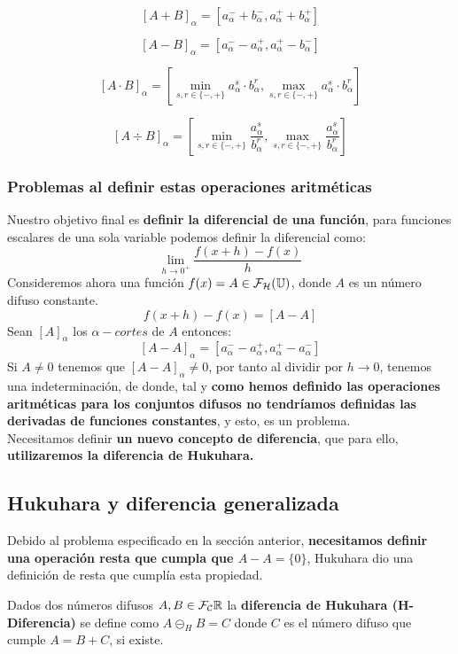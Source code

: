 $$
[A+B]_\alpha = [a_\alpha^- + b_\alpha^-, a_\alpha^+ + b_\alpha^+]
$$

$$
[A-B]_\alpha = [a_\alpha^- - a_\alpha^+, a_\alpha^+ - b_\alpha^-]
$$

$$
[A \cdot B]_\alpha = \left[ \min_{s, r \in \{-, +\}} a_\alpha^s \cdot b_\alpha^r, \max_{s, r \in \{-, +\}} a_\alpha^s \cdot b_\alpha^r\right]
$$

$$
[A \div B]_\alpha = \left[ \min_{s, r \in \{-, +\}} \frac{a_\alpha^s}{b_\alpha^r}, \max_{s, r \in \{-, +\}} \frac{a_\alpha^s}{b_\alpha^r}\right]
$$

\subsubsection{Problemas al definir estas operaciones aritméticas}
Nuestro objetivo final es \textbf{definir la diferencial de una función}, para funciones escalares de una sola variable podemos definir la diferencial como:
$$
\lim\limits_{h\rightarrow 0^+} \frac{f(x+h) - f(x)}{h}
$$
Consideremos ahora una función $f(x)=A\in \mathcal{F}_\mathcal{H}(\mathbb U)$, donde $A$ es un número difuso constante. \\
$$f(x+h) - f(x)=[A-A]$$
Sean $[A]_\alpha$ los $\alpha-cortes$ de $A$ entonces:
$$
[A-A]_\alpha = [a_\alpha^- - a_\alpha^+, a_\alpha^+ - a_\alpha^-]
$$
Si $A\neq 0$ tenemos que $[A-A]_\alpha \neq 0$, por tanto al dividir por $h \longrightarrow 0$, tenemos una indeterminación, de donde, tal y \textbf{como hemos definido las operaciones aritméticas para los conjuntos difusos no tendríamos definidas las derivadas de funciones constantes}, y esto, es un problema. \\
Necesitamos definir \textbf{un nuevo concepto de diferencia}, que para ello, \textbf{utilizaremos la diferencia de Hukuhara.}

\subsection{Hukuhara y diferencia generalizada} \label{def:hukukara}
Debido al problema especificado en la sección anterior, \textbf{necesitamos definir una operación resta que cumpla que $A-A=\{0\}$}, Hukuhara dio una definición de resta que cumplía esta propiedad.

\begin{definicion}
	Dados dos números difusos $A, B \in \mathcal{F}_\mathcal{C}\mathbb R$ la \textbf{diferencia de Hukuhara (H-Diferencia)} se define como $A \circleddash_H B = C$ donde $C$ es el número difuso que cumple $A=B+C$, si existe.
\end{definicion}

